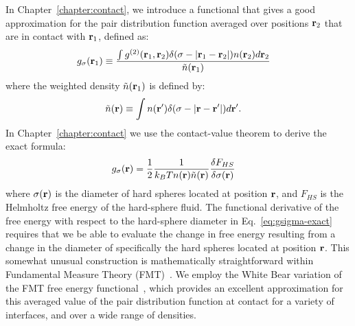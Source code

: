 In Chapter~\ref{chapter:contact}, we introduce a functional that gives
a good approximation for the pair distribution function averaged over
positions $\textbf{r}_2$ that are in contact with $\textbf{r}_1$, defined as:
\begin{align}
  g_\sigma(\textbf{r}_1) &\equiv \frac{ \int g^{(2)}(\textbf{r}_1,\textbf{r}_2) \delta(\sigma -|\textbf{r}_1-\textbf{r}_2|)n(\textbf{r}_2)
    d\textbf{r}_2 }{ \tilde{n}(\textbf{r}_1)  }
\end{align}
where the weighted density $\tilde{n}(\textbf{r}_1)$ is defined by:
\begin{align}
  \tilde{n}(\textbf{r}) &\equiv \int n(\textbf{r}') \delta(\sigma -|\textbf{r} - \textbf{r}'|)d\textbf{r}'.
\end{align}
In Chapter~\ref{chapter:contact} we use the contact-value theorem to derive the exact formula:
\begin{align}
  g_\sigma(\rr)%
  &= \frac12 \frac{1}{k_BT n(\rr) \tilde{n}(\rr)} \frac{\delta
    F_{HS}}{\delta \sigma(\mathbf{r})} \label{eq:gsigma-exact}
\end{align}
where $\sigma(\textbf{r})$ is the diameter of hard spheres located at
position $\textbf{r}$, and $F_{HS}$ is the Helmholtz free energy of the
hard-sphere fluid.  The functional derivative of the free energy with
respect to the hard-sphere diameter in Eq.~\ref{eq:gsigma-exact} requires
that we be able to evaluate the change in free energy resulting from a
change in the diameter of specifically the hard spheres located at
position $\textbf{r}$.  This somewhat unusual construction is mathematically
straightforward within Fundamental Measure Theory
(FMT)~\cite{rosenfeld1989free}.  We employ the White Bear variation of
the FMT free energy functional~\cite{roth2002whitebear}, which
provides an excellent approximation for this averaged value of the
pair distribution function at contact for a variety of interfaces, and
over a wide range of densities.




